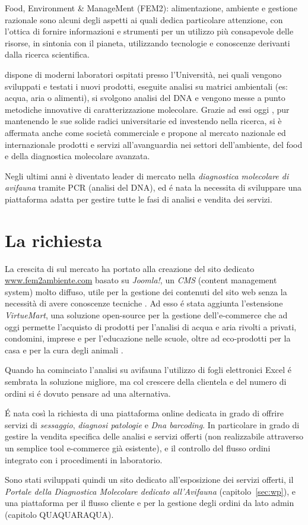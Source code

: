 Food, Environment \& ManageMent (FEM2): alimentazione, ambiente e gestione razionale sono alcuni degli aspetti ai quali {\fem} dedica particolare attenzione, con l'ottica di fornire informazioni e strumenti per un utilizzo più consapevole delle risorse, in sintonia con il pianeta, utilizzando tecnologie e conoscenze derivanti dalla ricerca scientifica.

{\fem} dispone di moderni laboratori ospitati presso l’Università, nei quali vengono sviluppati e testati i nuovi prodotti, eseguite analisi su matrici ambientali (es: acqua, aria o alimenti), si svolgono analisi del DNA e vengono messe a punto metodiche innovative di caratterizzazione molecolare. Grazie ad essi oggi {\fem}, pur mantenendo le sue solide radici universitarie ed investendo nella ricerca, si è affermata anche come società commerciale e propone al mercato nazionale ed internazionale prodotti e servizi all'avanguardia nei settori dell'ambiente, del food e della diagnostica molecolare avanzata.

Negli ultimi anni è diventato leader di mercato nella \emph{diagnostica molecolare di avifauna} tramite PCR (analisi del DNA), ed é nata la necessita di sviluppare una piattaforma adatta per gestire tutte le fasi di analisi e vendita dei servizi.

\section{La richiesta}
\label{sec:richiesta}

La crescita di {\fem} sul mercato ha portato alla creazione del sito dedicato \url{www.fem2ambiente.com} basato su \emph{Joomla!}, un \emph{CMS} (content management system) molto diffuso, utile per la gestione dei contenuti del sito web senza la necessità di avere conoscenze tecniche \cite{joomla}. Ad esso é stata aggiunta l'estensione \emph{VirtueMart}, una soluzione open-source per la gestione dell'e-commerce che ad oggi permette l'acquisto di prodotti per l'analisi di acqua e aria rivolti a privati, condomini, imprese e per l'educazione nelle scuole, oltre ad eco-prodotti per la casa e per la cura degli animali \cite{virtuemart}.

Quando {\fem} ha cominciato l'analisi su avifauna l'utilizzo di fogli elettronici Excel é sembrata la soluzione migliore, ma col crescere della clientela e del numero di ordini si é dovuto pensare ad una alternativa. 

É nata così la richiesta di una piattaforma online dedicata in grado di offrire servizi di \emph{sessaggio}, \emph{diagnosi patologie} e \emph{Dna barcoding}. In particolare in grado di gestire la vendita specifica delle analisi e servizi offerti (non realizzabile attraverso un semplice tool e-commerce già esistente), e il controllo del flusso ordini integrato con i procedimenti in laboratorio.

Sono stati sviluppati quindi un sito dedicato all'esposizione dei servizi offerti, il \emph{Portale della Diagnostica Molecolare dedicato all'Avifauna} (capitolo~\ref{sec:wp}), e una piattaforma per il flusso cliente e per la gestione degli ordini da lato admin (capitolo QUAQUARAQUA).
